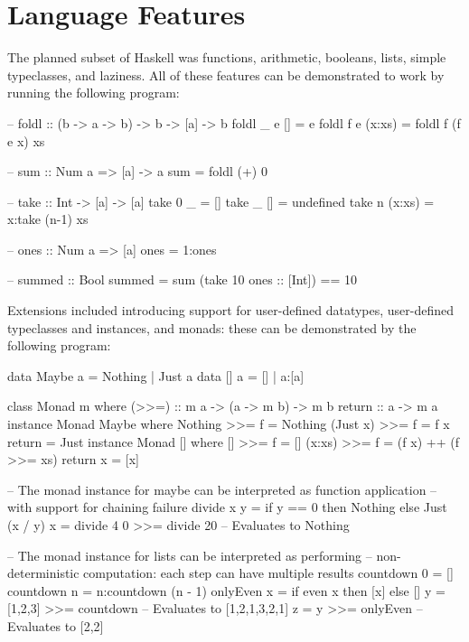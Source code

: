 \documentclass[dissertation.tex]{subfiles}
\begin{document}
\section{Language Features}
{

    The planned subset of Haskell was functions, arithmetic, booleans, lists, simple typeclasses, and laziness. All of
    these features can be demonstrated to work by running the following program:

    \begin{haskellfigure}
    -- foldl :: (b -> a -> b) -> b -> [a] -> b
    foldl _ e [] = e
    foldl f e (x:xs) = foldl f (f e x) xs

    -- sum :: Num a => [a] -> a
    sum = foldl (+) 0

    -- take :: Int -> [a] -> [a]
    take 0 _ = []
    take _ [] = undefined
    take n (x:xs) = x:take (n-1) xs

    -- ones :: Num a => [a]
    ones = 1:ones

    -- summed :: Bool
    summed = sum (take 10 ones :: [Int]) == 10
    \end{haskellfigure}

    Extensions included introducing support for user-defined datatypes, user-defined typeclasses and instances, and
    monads: these can be demonstrated by the following program:

    \begin{haskellfigure}
    data Maybe a = Nothing | Just a
    data [] a = [] | a:[a]
    
    class Monad m where
        (>>=) :: m a -> (a -> m b) -> m b
        return :: a -> m a
    instance Monad Maybe where
        Nothing >>= f = Nothing
        (Just x) >>= f = f x
        return = Just
    instance Monad [] where
        [] >>= f = []
        (x:xs) >>= f = (f x) ++ (f >>= xs)
        return x = [x]

    -- The monad instance for maybe can be interpreted as function application
    -- with support for chaining failure
    divide x y = if y == 0 then Nothing else Just (x / y)
    x = divide 4 0 >>= divide 20 -- Evaluates to Nothing

    -- The monad instance for lists can be interpreted as performing
    -- non-deterministic computation: each step can have multiple results
    countdown 0 = []
    countdown n = n:countdown (n - 1)
    onlyEven x = if even x then [x] else []
    y = [1,2,3] >>= countdown -- Evaluates to [1,2,1,3,2,1]
    z = y >>= onlyEven -- Evaluates to [2,2]
    \end{haskellfigure}

}
\end{document}
